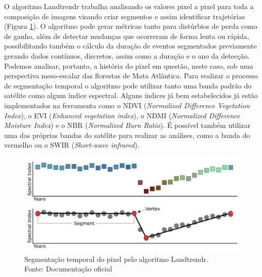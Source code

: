 O algoritmo Landtrendr trabalha analisando os valores pixel a pixel para toda a composição de imagens visando criar segmentos e assim identificar trajetórias (Figura \ref{fig:landtrendr_graph}). O algoritmo pode gerar métricas tanto para distúrbios de perda como de ganho, além de detectar mudanças que ocorreram de forma lenta ou rápida, possibilitando também o cálculo da duração de eventos segmentados previamente gerando dados contínuos, discretos, assim como a duração e o ano da detecção. Podemos analisar, portanto, a história do pixel em questão, neste caso, sob uma perspectiva meso-escalar das florestas de Mata Atlântica. Para realizar o processo de segmentação temporal o algoritmo pode utilizar tanto uma banda padrão do satélite como algum índice espectral. Alguns índices já bem estabelecidos já estão implementados na ferramenta como o NDVI (\textit{Normalized Difference Vegetation Index}), o EVI (\textit{Enhanced vegetation index}), o NDMI (\textit{Normalized Difference Moisture Index}) e o NBR (\textit{Normalized Burn Ratio}). É possível também utilizar uma das próprias bandas do satélite para realizar as análises, como a banda do vermelho ou o SWIR (\textit{Short-wave infrared}). 


\begin{figure}[h!]
    \centering
    \includegraphics[scale=.8]{images/landtrendr_graphic.pdf}
    \caption{Segmentação temporal do pixel pelo algoritmo Landtrendr. \\ Fonte: Documentação oficial}
    \label{fig:landtrendr_graph}
\end{figure}

